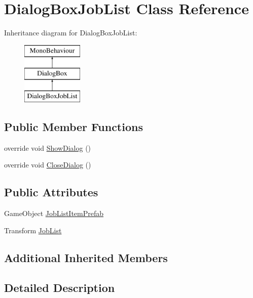 \hypertarget{class_dialog_box_job_list}{}\section{Dialog\+Box\+Job\+List Class Reference}
\label{class_dialog_box_job_list}
Inheritance diagram for Dialog\+Box\+Job\+List\+:\begin{figure}[H]
\begin{center}
\leavevmode
\includegraphics[height=3.000000cm]{class_dialog_box_job_list}
\end{center}
\end{figure}
\subsection*{Public Member Functions}
\begin{DoxyCompactItemize}
\item 
override void \hyperlink{class_dialog_box_job_list_a09f09a252b810e63c0f2ee221bef2685}{Show\+Dialog} ()
\item 
override void \hyperlink{class_dialog_box_job_list_aa3d5098f6bab14d057a54df2dbd045da}{Close\+Dialog} ()
\end{DoxyCompactItemize}
\subsection*{Public Attributes}
\begin{DoxyCompactItemize}
\item 
Game\+Object \hyperlink{class_dialog_box_job_list_ab44498019796bbe10874da1e0bf90005}{Job\+List\+Item\+Prefab}
\item 
Transform \hyperlink{class_dialog_box_job_list_a28245735b534be0375f9430fc535e443}{Job\+List}
\end{DoxyCompactItemize}
\subsection*{Additional Inherited Members}


\subsection{Detailed Description}


